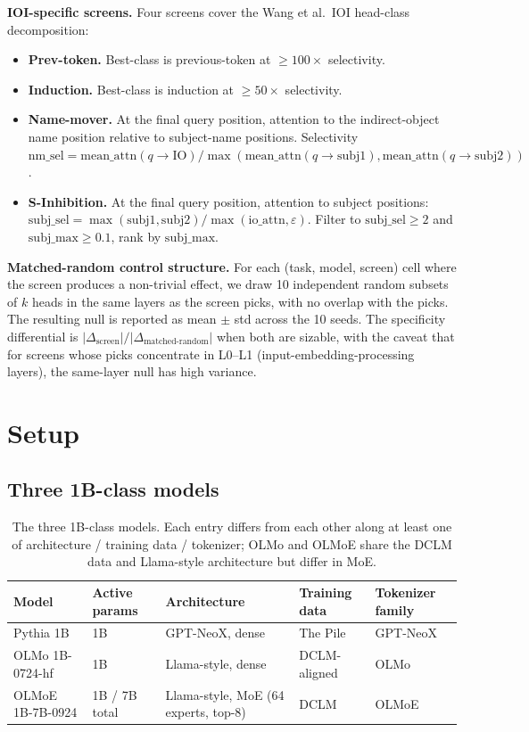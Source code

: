 \documentclass[11pt]{article}
\begin{document}
\textbf{IOI-specific screens.} Four screens cover the Wang et al.\ IOI head-class decomposition:
\begin{itemize}[topsep=2pt,itemsep=2pt]
\item \textbf{Prev-token.} Best-class is previous-token at $\geq 100\times$ selectivity.
\item \textbf{Induction.} Best-class is induction at $\geq 50\times$ selectivity.
\item \textbf{Name-mover.} At the final query position, attention to the indirect-object name position relative to subject-name positions. Selectivity $\mathrm{nm\_sel} = \text{mean\_attn}(q \to \text{IO}) / \max(\text{mean\_attn}(q \to \text{subj1}), \text{mean\_attn}(q \to \text{subj2}))$.
\item \textbf{S-Inhibition.} At the final query position, attention to subject positions: $\mathrm{subj\_sel} = \max(\text{subj1}, \text{subj2}) / \max(\text{io\_attn}, \varepsilon)$. Filter to $\mathrm{subj\_sel} \geq 2$ and $\mathrm{subj\_max} \geq 0.1$, rank by $\mathrm{subj\_max}$.
\end{itemize}

\textbf{Matched-random control structure.} For each (task, model, screen) cell where the screen produces a non-trivial effect, we draw 10 independent random subsets of $k$ heads in the same layers as the screen picks, with no overlap with the picks. The resulting null is reported as mean $\pm$ std across the 10 seeds. The specificity differential is $|\Delta_\text{screen}| / |\Delta_\text{matched-random}|$ when both are sizable, with the caveat that for screens whose picks concentrate in L0--L1 (input-embedding-processing layers), the same-layer null has high variance.

\section{Setup}
\label{sec:setup}

\subsection{Three 1B-class models}

\begin{table}[h]
\centering
\small
\begin{tabular}{lllll}
\toprule
Model & Active params & Architecture & Training data & Tokenizer family \\
\midrule
Pythia 1B & 1B & GPT-NeoX, dense & The Pile & GPT-NeoX \\
OLMo 1B-0724-hf & 1B & Llama-style, dense & DCLM-aligned & OLMo \\
OLMoE 1B-7B-0924 & 1B / 7B total & Llama-style, MoE (64 experts, top-8) & DCLM & OLMoE \\
\bottomrule
\end{tabular}
\caption{The three 1B-class models. Each entry differs from each other along at least one of architecture / training data / tokenizer; OLMo and OLMoE share the DCLM data and Llama-style architecture but differ in MoE.}
\label{tab:models}
\end{table}
\end{document}
